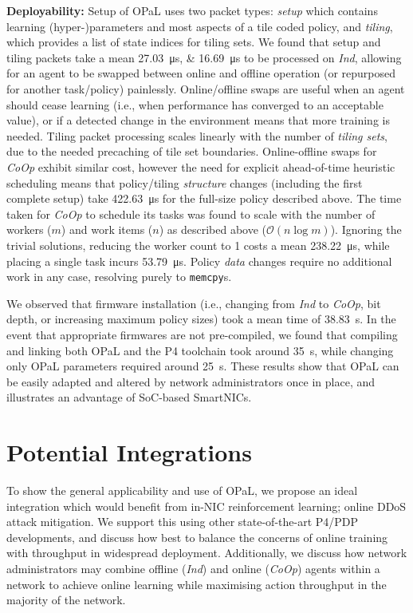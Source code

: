 \documentclass[
sigconf,natbib=false
]{acmart}
\newcommand{\fakepara}[1]{\noindent\textbf{#1:}}
\newcommand{\approachshort}{OPaL}
\newcommand{\Coopfw}{\emph{CoOp}}
\newcommand{\Indfw}{\emph{Ind}}
\begin{document}
\fakepara{Deployability}
Setup of \approachshort{} uses two packet types: \emph{setup} which contains learning (hyper-)parameters and most aspects of a tile coded policy, and \emph{tiling}, which provides a list of state indices for tiling sets.
We found that setup and tiling packets take a mean \qtylist{27.03;16.69}{\micro\second} to be processed on \Indfw{}, allowing for an agent to be swapped between online and offline operation (or repurposed for another task/policy) painlessly.
Online/offline swaps are useful when an agent should cease learning (i.e., when performance has converged to an acceptable value), or if a detected change in the environment means that more training is needed.
Tiling packet processing scales linearly with the number of \emph{tiling sets}, due to the needed precaching of tile set boundaries.
Online-offline swaps for \Coopfw{} exhibit similar cost, however the need for explicit ahead-of-time heuristic scheduling means that policy/tiling \emph{structure} changes (including the first complete setup) take \SI{422.63}{\micro\second} for the full-size policy described above.
The time taken for \Coopfw{} to schedule its tasks was found to scale with the number of workers ($m$) and work items ($n$) as described above ($\mathcal{O}{\left(n\log{m}\right)}$).
Ignoring the trivial solutions, reducing the worker count to \num{1} costs a mean \SI{238.22}{\micro\second}, while placing a single task incurs \SI{53.79}{\micro\second}.
Policy \emph{data} changes require no additional work in any case, resolving purely to \texttt{memcpy}s.

We observed that firmware installation (i.e., changing from \Indfw{} to \Coopfw{}, bit depth, or increasing maximum policy sizes) took a mean time of \SI{38.83}{\second}.
In the event that appropriate firmwares are not pre-compiled, we found that compiling and linking both \approachshort{} and the P4 toolchain took around \SI{35}{\second}, while changing only \approachshort{} parameters required around \SI{25}{\second}.
These results show that \approachshort{} can be easily adapted and altered by network administrators once in place, and illustrates an advantage of SoC-based SmartNICs.

\section{Potential Integrations}\label{sec:potential-integrations}
To show the general applicability and use of \approachshort{}, we propose an ideal integration which would benefit from in-NIC reinforcement learning; online DDoS attack mitigation.
We support this using other state-of-the-art P4/PDP developments, and discuss how best to balance the concerns of online training with throughput in widespread deployment.
Additionally, we discuss how network administrators may combine offline (\Indfw) and online (\Coopfw) agents within a network to achieve online learning while maximising action throughput in the majority of the network.
\end{document}

